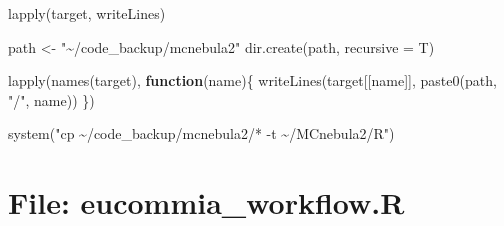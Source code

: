 \documentclass[
]{article}
\newenvironment{Shaded}{\begin{snugshade}}{\end{snugshade}}
\newcommand{\AttributeTok}[1]{\textcolor[rgb]{0.77,0.63,0.00}{#1}}
\newcommand{\ControlFlowTok}[1]{\textcolor[rgb]{0.13,0.29,0.53}{\textbf{#1}}}
\newcommand{\FunctionTok}[1]{\textcolor[rgb]{0.00,0.00,0.00}{#1}}
\newcommand{\NormalTok}[1]{#1}
\newcommand{\OtherTok}[1]{\textcolor[rgb]{0.56,0.35,0.01}{#1}}
\newcommand{\StringTok}[1]{\textcolor[rgb]{0.31,0.60,0.02}{#1}}
\begin{document}
\begin{Shaded}
\begin{Highlighting}[]
\FunctionTok{lapply}\NormalTok{(target, writeLines)}

\NormalTok{path }\OtherTok{\textless{}{-}} \StringTok{"\textasciitilde{}/code\_backup/mcnebula2"}
\FunctionTok{dir.create}\NormalTok{(path, }\AttributeTok{recursive =}\NormalTok{ T)}

\FunctionTok{lapply}\NormalTok{(}\FunctionTok{names}\NormalTok{(target),}
       \ControlFlowTok{function}\NormalTok{(name)\{}
         \FunctionTok{writeLines}\NormalTok{(target[[name]], }\FunctionTok{paste0}\NormalTok{(path, }\StringTok{"/"}\NormalTok{, name))}
\NormalTok{       \})}

\FunctionTok{system}\NormalTok{(}\StringTok{"cp \textasciitilde{}/code\_backup/mcnebula2/* {-}t \textasciitilde{}/MCnebula2/R"}\NormalTok{)}
\end{Highlighting}
\end{Shaded}

\hypertarget{file-eucommia_workflow.r}{%
\section{File: eucommia\_workflow.R}\label{file-eucommia_workflow.r}}
\end{document}
